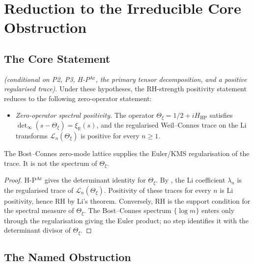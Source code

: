\section{Reduction to the Irreducible Core Obstruction}
\label{v4-arith:vb:reduction-core}

\subsection{The Core Statement}
\label{v4-arith:vb:core-statement}

\begin{theorem}
\label{v4-arith:vb:thm:reduction}
\ClaimStatusProvedHere \emph{(conditional on P2, P3,
H-P\(^{\mathrm{Ar}}\), the primary tensor decomposition, and a positive
regularised trace)}. Under these hypotheses, the RH-strength
positivity statement reduces to the following zero-operator statement:
\begin{itemize}
\item[\textbf{(VB\(^{*}_{\mathrm{core}}\))}] \emph{Zero-operator spectral
positivity.} The operator
\(\Theta_{\xi}=1/2+iH_{\mathrm{HP}}\) satisfies
\(\det_{\infty}(s-\Theta_{\xi})=\xi_{\mathbb R}(s)\), and the
regularised Weil--Connes trace on the Li transforms
\(\mathcal L_n(\Theta_{\xi})\) is positive for every \(n\geq1\).
\end{itemize}
The Bost--Connes zero-mode lattice supplies the Euler/KMS
regularisation of the trace. It is not the spectrum of
\(\Theta_{\xi}\).
\end{theorem}

\begin{proof}
H-P\(^{\mathrm{Ar}}\) gives the determinant identity for
\(\Theta_{\xi}\). By
, the Li coefficient
\(\lambda_n\) is the regularised trace of
\(\mathcal L_n(\Theta_{\xi})\). Positivity of these traces for every
\(n\) is Li positivity, hence RH by Li's theorem. Conversely, RH is
the support condition for the spectral measure of \(\Theta_{\xi}\).
The Bost--Connes spectrum \(\{\log m\}\) enters only through the
regularisation giving the Euler product; no step identifies it with
the determinant divisor of \(\Theta_{\xi}\).
\end{proof}

\subsection{The Named Obstruction}
\label{v4-arith:vb:named-obstruction}

